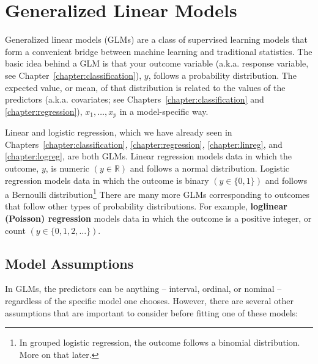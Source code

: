 \chapter{Generalized Linear Models \label{chapter:glms}}

Generalized linear models (GLMs) are a class of supervised learning models that form a convenient bridge between machine learning and traditional statistics. The basic idea behind a GLM is that your outcome variable (a.k.a. response variable, see Chapter~\ref{chapter:classification}), $y$, follows a probability distribution. The expected value, or mean, of that distribution is related to the values of the predictors (a.k.a. covariates; see Chapters~\ref{chapter:classification} and \ref{chapter:regression}), $x_1, \dots, x_p$ in a model-specific way.

Linear and logistic regression, which we have already seen in Chapters~\ref{chapter:classification}, \ref{chapter:regression}, \ref{chapter:linreg}, and \ref{chapter:logreg}, are both GLMs. Linear regression models data in which the outcome, $y$, is numeric $\left( y \in \mathbb{R} \right)$ and follows a normal distribution. Logistic regression models data in which the outcome is binary $\left( y \in \{0, 1\} \right)$ and follows a Bernoulli distribution\footnote{In grouped logistic regression, the outcome follows a binomial distribution. More on that later.} There are many more GLMs corresponding to outcomes that follow other types of probability distributions. For example, \textbf{loglinear (Poisson) regression} models data in which the outcome is a positive integer, or count $\left( y \in \{0, 1, 2, \dots\} \right)$. 


\section{Model Assumptions}

In GLMs, the predictors can be anything -- interval, ordinal, or nominal -- regardless of the specific model one chooses. However, there are several other assumptions that are important to consider before fitting one of these models:

